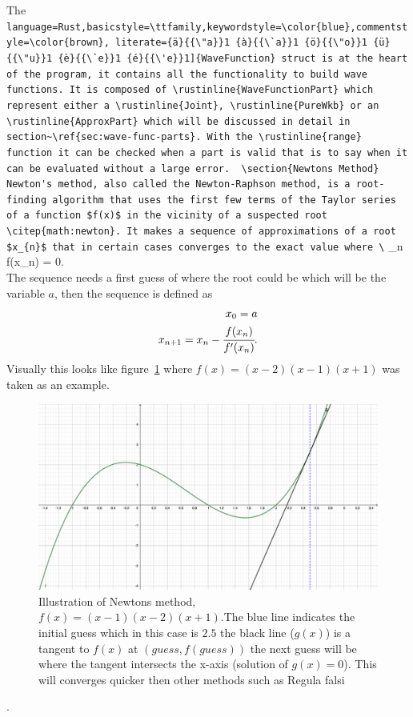\documentclass[11pt,DIV=10,final]{scrreprt} %
\providecommand{\rustinline}{\lstinline[language=Rust,basicstyle=\ttfamily,keywordstyle=\color{blue},commentstyle=\color{brown}, literate={ä}{{\"a}}1 {à}{{\`a}}1 {ö}{{\"o}}1 {ü}{{\"u}}1 {è}{{\`e}}1 {é}{{\'e}}1]} % für Inline-C++ Code
\begin{document}
The \rustinline{WaveFunction} struct is at the heart of the program, it contains all the functionality to build wave functions. It is composed of \rustinline{WaveFunctionPart} which represent either a
\rustinline{Joint}, \rustinline{PureWkb} or an \rustinline{ApproxPart} which will be discussed in detail in section~\ref{sec:wave-func-parts}. With the \rustinline{range} function it can be checked when a
part is valid that is to say when it can be evaluated without a large error.

\section{Newtons Method}
Newton's method, also called the Newton-Raphson method, is a root-finding algorithm that uses the first few terms of the Taylor series of a function $f(x)$ in the vicinity of a suspected root
\citep{math:newton}. It makes a sequence of approximations of a root $x_{n}$ that in certain cases converges to the exact value where
\[
  \lim _{n \to \infty}f(x_{n}) = 0.
\]
\\
The sequence needs a first guess of where the root could be which will be the variable $a$, then the sequence is defined as
\begin{align*}
  x_{0}=a \\*
  x_{n+1}=x_{n}-\cfrac{f(x_{n})}{f'(x_{n})}.
\end{align*}
Visually this looks like figure~\ref{fig:newton-ilust} where $f(x) = (x-2)(x-1)(x+1)$ was taken as an example.
\begin{figure}[H]
	\includegraphics[width=\textwidth]{plots/newtons-method.pdf}
	\caption{Illustration of Newtons method, $f(x) = (x-1)(x-2)(x+1)$.The blue line indicates the initial guess which in this case is $2.5$ the black line ($g(x)$) is a tangent to $f(x)$ at
      $(guess, f(guess))$ the next guess will be where the tangent intersects the x-axis (solution of $g(x) = 0$). This will converges quicker then other methods such as Regula falsi}
	\label{fig:newton-ilust}
\end{figure}
.
\end{document}
